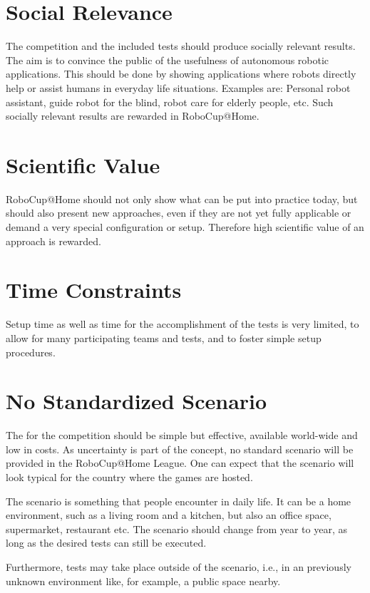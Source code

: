\section{Social Relevance}
\label{concept:social_relevance}
The competition and the included tests should produce socially relevant results. The aim is to convince the public of the usefulness of autonomous robotic applications. This should be done by showing applications where robots directly help or assist humans in everyday life situations. Examples are: Personal robot assistant, guide robot for the blind, robot care for elderly people, etc. Such socially relevant results are rewarded in RoboCup@Home.

\section{Scientific Value}
\label{concept:scientific_value}
RoboCup@Home should not only show what can be put into practice today, but should also present new approaches, even if they are not yet fully applicable or demand a very special configuration or setup. Therefore high scientific value of an approach is rewarded.

\section{Time Constraints}
\label{concept:time_constraints}
Setup time as well as time for the accomplishment of the tests is very limited, to allow for many participating teams and tests, and to foster simple setup procedures.

\section{No Standardized Scenario}
\label{concept:no_standardized_scenario}
The  for the competition should be simple but effective, available world-wide and low in costs. As uncertainty is part of the concept, no standard scenario will be provided in the RoboCup@Home League. One can expect that the scenario will look typical for the country where the games are hosted.

The scenario is something that people encounter in daily life. It can be a home environment, such as a living room and a kitchen, but also an office space, supermarket, restaurant etc. The scenario should change from year to year, as long as the desired tests can still be executed.

Furthermore, tests may take place outside of the scenario, i.e., in an previously unknown environment like, for example, a public space nearby.

